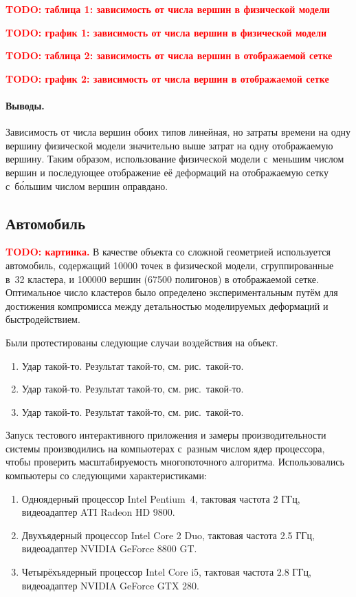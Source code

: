 \documentclass[a4paper, 14pt, titlepage]{extarticle}
\newcommand{\todo}[1]{\textbf{\textcolor{red}{TODO: #1}}}
\begin{document}
      \todo{таблица 1: зависимость от числа вершин в физической модели}

      \todo{график 1: зависимость от числа вершин в физической модели}

      \todo{таблица 2: зависимость от числа вершин в отображаемой сетке}

      \todo{график 2: зависимость от числа вершин в отображаемой сетке}

      \paragraph{Выводы.} Зависимость от числа вершин обоих типов линейная, но затраты времени на
      одну вершину физической модели значительно выше затрат на одну отображаемую вершину.  Таким
      образом, использование физической модели с~меньшим числом вершин и последующее отображение
      её деформаций на отображаемую сетку с~б\'{о}льшим числом вершин оправдано.

    \subsection{Автомобиль}

      \todo{картинка.} В качестве объекта со сложной геометрией используется автомобиль, содержащий
      10000 точек в физической модели, сгруппированные в~32 кластера, и 100000 вершин (67500
      полигонов) в отображаемой сетке. Оптимальное число кластеров было определено экспериментальным
      путём для достижения компромисса между детальностью моделируемых деформаций и быстродействием.

      Были протестированы следующие случаи воздействия на объект.
      \begin{enumerate}
        \item Удар такой-то. Результат такой-то, см. рис.~такой-то.
        \item Удар такой-то. Результат такой-то, см. рис.~такой-то.
        \item Удар такой-то. Результат такой-то, см. рис.~такой-то.
      \end{enumerate}

      Запуск тестового интерактивного приложения и замеры производительности системы
      производились на компьютерах с~разным числом ядер процессора, чтобы проверить масштабируемость
      многопоточного алгоритма. Использовались компьютеры со следующими характеристиками:
      \begin{enumerate}
        \item Одноядерный процессор Intel Pentium~4, тактовая частота 2 ГГц, видеоадаптер ATI Radeon HD 9800.
        \item Двухъядерный процессор Intel Core 2 Duo, тактовая частота 2.5 ГГц, видеоадаптер NVIDIA GeForce 8800 GT.
        \item Четырёхъядерный процессор Intel Core i5, тактовая частота 2.8 ГГц, видеоадаптер NVIDIA GeForce GTX 280.
      \end{enumerate}
\end{document}
